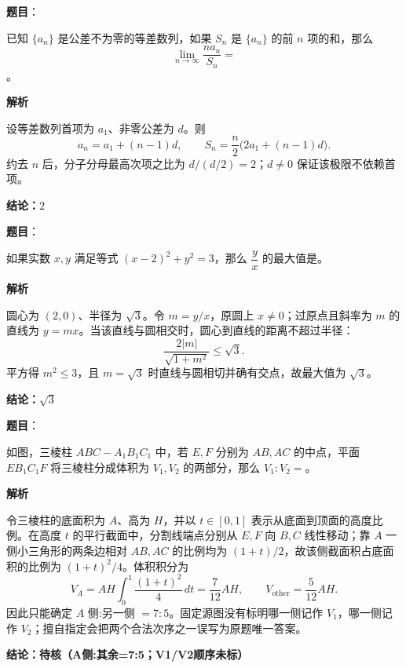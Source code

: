 \begin{answer}

\textbf{题目}：

已知 $\{a_n\}$ 是公差不为零的等差数列，如果 $S_n$ 是 $\{a_n\}$ 的前 $n$ 项的和，那么
\nopagebreak[4]
\[
\lim_{n\to\infty}\frac{na_n}{S_n}=
\]
\gkblank{}。

\textbf{解析}

设等差数列首项为 $a_1$、非零公差为 $d$。则
\nopagebreak[4]
\[
a_n=a_1+(n-1)d,\qquad S_n=\frac n2\bigl(2a_1+(n-1)d\bigr).
\]
约去 $n$ 后，分子分母最高次项之比为 $d/(d/2)=2$；$d\ne0$ 保证该极限不依赖首项。

\textbf{结论：$2$}


\end{answer}
\begin{answer}

\textbf{题目}：

如果实数 $x,y$ 满足等式 $(x-2)^2+y^2=3$，那么 $\dfrac yx$ 的最大值是\gkblank{}。

\textbf{解析}

圆心为 $(2,0)$、半径为 $\sqrt3$。令 $m=y/x$，原圆上 $x\ne0$；过原点且斜率为 $m$ 的直线为 $y=mx$。当该直线与圆相交时，圆心到直线的距离不超过半径：
\nopagebreak[4]
\[
\frac{2|m|}{\sqrt{1+m^2}}\le\sqrt3.
\]
平方得 $m^2\le3$，且 $m=\sqrt3$ 时直线与圆相切并确有交点，故最大值为 $\sqrt3$。

\textbf{结论：$\sqrt3$}


\end{answer}
\begin{answer}

\textbf{题目}：

如图，三棱柱 $ABC-A_1B_1C_1$ 中，若 $E,F$ 分别为 $AB,AC$ 的中点，平面 $EB_1C_1F$ 将三棱柱分成体积为 $V_1,V_2$ 的两部分，那么 $V_1:V_2=$\gkblank{}。
\nopagebreak[4]
\begin{center}\end{center}
\nopagebreak[4]
\textbf{解析}

令三棱柱的底面积为 $A$、高为 $H$，并以 $t\in[0,1]$ 表示从底面到顶面的高度比例。在高度 $t$ 的平行截面中，分割线端点分别从 $E,F$ 向 $B,C$ 线性移动；靠 $A$ 一侧小三角形的两条边相对 $AB,AC$ 的比例均为 $(1+t)/2$，故该侧截面积占底面积的比例为 $(1+t)^2/4$。体积积分为
\nopagebreak[4]
\[
V_A=AH\int_0^1\frac{(1+t)^2}{4}\,dt=\frac7{12}AH,
\qquad V_{\mathrm{other}}=\frac5{12}AH.
\]
因此只能确定 $A$ 侧:另一侧 $=7:5$。固定源图没有标明哪一侧记作 $V_1$，哪一侧记作 $V_2$；擅自指定会把两个合法次序之一误写为原题唯一答案。

\textbf{结论：待核（A侧:其余=7:5；V1/V2顺序未标）}


\end{answer}
